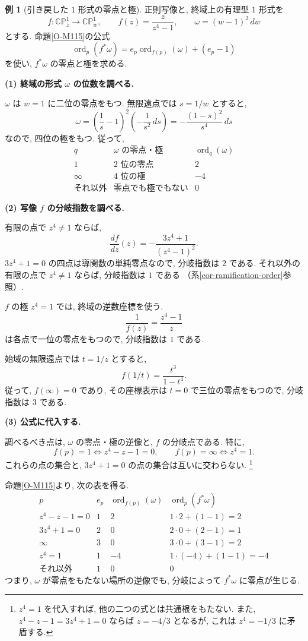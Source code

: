 \documentclass[dvipdfmx,a4paper,11pt]{article} %
\newcommand{\C}{\mathbb{C}}
\theoremstyle{definition}
\numberwithin{equation}{section}
\newtheorem{exa}[thm]{例}
\begin{document}
\begin{exa}[引き戻した $1$ 形式の零点と極]\label{O-M116}
正則写像と, 終域上の有理型 $1$ 形式を
\[
f:\C\mathbb P^1_z\longrightarrow\C\mathbb P^1_w,
\qquad
f(z)=\frac{z}{z^4-1},
\qquad
\omega=(w-1)^2\,dw
\]
とする.
命題\ref{O-M115}の公式
\[
\operatorname{ord}_p(f^*\omega)
=e_p\operatorname{ord}_{f(p)}(\omega)+(e_p-1)
\]
を使い, $f^*\omega$ の零点と極を求める.

\medskip
\noindent
\textbf{(1) 終域の形式 $\omega$ の位数を調べる.}

$\omega$ は $w=1$ に二位の零点をもつ.
無限遠点では $s=1/w$ とすると,
\[
\omega
=\left(\frac1s-1\right)^2\left(-\frac1{s^2}\,ds\right)
=-\frac{(1-s)^2}{s^4}\,ds
\]
なので, 四位の極をもつ.
従って,
\[
\begin{array}{c|c|c}
q&\omega\text{ の零点・極}&\operatorname{ord}_q(\omega)\\ \hline
1&2\text{ 位の零点}&2\\
\infty&4\text{ 位の極}&-4\\
\text{それ以外}&\text{零点でも極でもない}&0
\end{array}
\]

\medskip
\noindent
\textbf{(2) 写像 $f$ の分岐指数を調べる.}

有限の点で $z^4\neq1$ ならば,
\[
\frac{df}{dz}(z)=-\frac{3z^4+1}{(z^4-1)^2}.
\]
$3z^4+1=0$ の四点は導関数の単純零点なので,
分岐指数は $2$ である.
それ以外の有限の点で $z^4\neq1$ ならば,
分岐指数は $1$ である
（系\ref{cor-ramification-order}参照）.

$f$ の極 $z^4=1$ では, 終域の逆数座標を使う.
\[
\frac1{f(z)}=\frac{z^4-1}{z}
\]
は各点で一位の零点をもつので, 分岐指数は $1$ である.

始域の無限遠点では $t=1/z$ とすると,
\[
f(1/t)=\frac{t^3}{1-t^4}.
\]
従って, $f(\infty)=0$ であり,
その座標表示は $t=0$ で三位の零点をもつので,
分岐指数は $3$ である.

\medskip
\noindent
\textbf{(3) 公式に代入する.}

調べるべき点は, $\omega$ の零点・極の逆像と,
$f$ の分岐点である.
特に,
\[
f(p)=1\iff z^4-z-1=0,\qquad
f(p)=\infty\iff z^4=1.
\]
これらの点の集合と, $3z^4+1=0$ の点の集合は互いに交わらない.
\footnote{
$z^4=1$ を代入すれば, 他の二つの式とは共通根をもたない.
また, $z^4-z-1=3z^4+1=0$ ならば $z=-4/3$ となるが,
これは $z^4=-1/3$ に矛盾する.
}

命題\ref{O-M115}より, 次の表を得る.
\[
\begin{array}{c|c|c|c}
p&e_p&\operatorname{ord}_{f(p)}(\omega)
&\operatorname{ord}_p(f^*\omega)\\ \hline
z^4-z-1=0&1&2&1\cdot2+(1-1)=2\\
3z^4+1=0&2&0&2\cdot0+(2-1)=1\\
\infty&3&0&3\cdot0+(3-1)=2\\
z^4=1&1&-4&1\cdot(-4)+(1-1)=-4\\
\text{それ以外}&1&0&0
\end{array}
\]
つまり, $\omega$ が零点をもたない場所の逆像でも,
分岐によって $f^*\omega$ に零点が生じる.


\end{exa}
\end{document}
